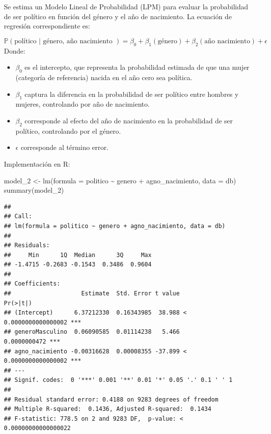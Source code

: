 \documentclass[
  12pt,
  a4paper,
]{article}
\newenvironment{Shaded}{\begin{snugshade}}{\end{snugshade}}
\newcommand{\AttributeTok}[1]{\textcolor[rgb]{0.77,0.63,0.00}{#1}}
\newcommand{\FunctionTok}[1]{\textcolor[rgb]{0.00,0.00,0.00}{#1}}
\newcommand{\NormalTok}[1]{#1}
\newcommand{\OtherTok}[1]{\textcolor[rgb]{0.56,0.35,0.01}{#1}}
\newcommand{\SpecialCharTok}[1]{\textcolor[rgb]{0.00,0.00,0.00}{#1}}
\providecommand{\tightlist}{%
  \setlength{\itemsep}{0pt}\setlength{\parskip}{0pt}}
\begin{document}
Se estima un Modelo Lineal de Probabilidad (LPM) para evaluar la probabilidad de ser político en función del género y el año de nacimiento. La ecuación de regresión correspondiente es:

\[
\mathbb{P}(\text{político | género, año nacimiento }) = \beta_{0} + \beta_{1}(\text{género}) + \beta_{2}(\text{año nacimiento}) + \epsilon
\] Donde:

\begin{itemize}
\tightlist
\item
  \(\beta_{0}\) es el intercepto, que representa la probabilidad estimada de que una mujer (categoría de referencia) nacida en el año cero sea política.
\item
  \(\beta_{1}\) captura la diferencia en la probabilidad de ser político entre hombres y mujeres, controlando por año de nacimiento.
\item
  \(\beta_{2}\) corresponde al efecto del año de nacimiento en la probabilidad de ser político, controlando por el género.
\item
  \(\epsilon\) corresponde al término error.
\end{itemize}

Implementación en R:

\begin{Shaded}
\begin{Highlighting}[]
\NormalTok{model\_2 }\OtherTok{\textless{}{-}} \FunctionTok{lm}\NormalTok{(}\AttributeTok{formula =}\NormalTok{ politico }\SpecialCharTok{\textasciitilde{}}\NormalTok{ genero }\SpecialCharTok{+} 
\NormalTok{                agno\_nacimiento, }\AttributeTok{data =}\NormalTok{ db)}
\FunctionTok{summary}\NormalTok{(model\_2)}
\end{Highlighting}
\end{Shaded}

\begin{verbatim}
## 
## Call:
## lm(formula = politico ~ genero + agno_nacimiento, data = db)
## 
## Residuals:
##     Min      1Q  Median      3Q     Max 
## -1.4715 -0.2683 -0.1543  0.3486  0.9604 
## 
## Coefficients:
##                    Estimate  Std. Error t value             Pr(>|t|)    
## (Intercept)      6.37212330  0.16343985  38.988 < 0.0000000000000002 ***
## generoMasculino  0.06090585  0.01114238   5.466         0.0000000472 ***
## agno_nacimiento -0.00316628  0.00008355 -37.899 < 0.0000000000000002 ***
## ---
## Signif. codes:  0 '***' 0.001 '**' 0.01 '*' 0.05 '.' 0.1 ' ' 1
## 
## Residual standard error: 0.4188 on 9283 degrees of freedom
## Multiple R-squared:  0.1436, Adjusted R-squared:  0.1434 
## F-statistic: 778.5 on 2 and 9283 DF,  p-value: < 0.00000000000000022
\end{verbatim}
\end{document}
